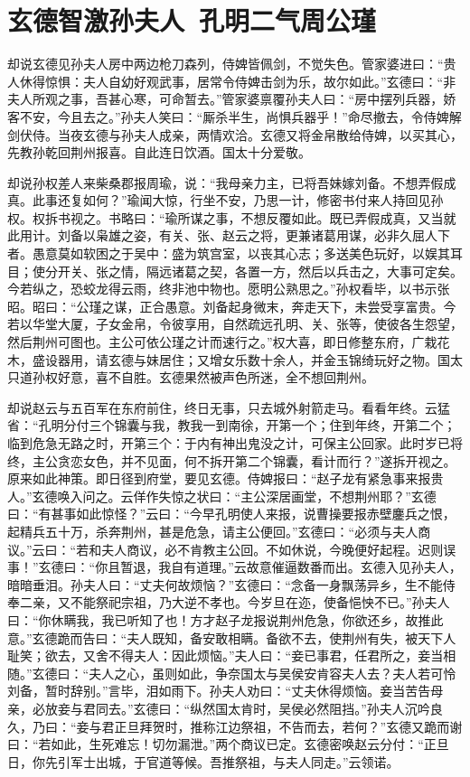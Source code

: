 \chapter{玄德智激孙夫人~孔明二气周公瑾}

却说玄德见孙夫人房中两边枪刀森列，侍婢皆佩剑，不觉失色。管家婆进曰：“贵人休得惊惧：夫人自幼好观武事，居常令侍婢击剑为乐，故尔如此。”玄德曰：“非夫人所观之事，吾甚心寒，可命暂去。”管家婆禀覆孙夫人曰：“房中摆列兵器，娇客不安，今且去之。”孙夫人笑曰：“厮杀半生，尚惧兵器乎！”命尽撤去，令侍婢解剑伏侍。当夜玄德与孙夫人成亲，两情欢洽。玄德又将金帛散给侍婢，以买其心，先教孙乾回荆州报喜。自此连日饮酒。国太十分爱敬。

却说孙权差人来柴桑郡报周瑜，说：“我母亲力主，已将吾妹嫁刘备。不想弄假成真。此事还复如何？”瑜闻大惊，行坐不安，乃思一计，修密书付来人持回见孙权。权拆书视之。书略曰：“瑜所谋之事，不想反覆如此。既已弄假成真，又当就此用计。刘备以枭雄之姿，有关、张、赵云之将，更兼诸葛用谋，必非久屈人下者。愚意莫如软困之于吴中：盛为筑宫室，以丧其心志；多送美色玩好，以娱其耳目；使分开关、张之情，隔远诸葛之契，各置一方，然后以兵击之，大事可定矣。今若纵之，恐蛟龙得云雨，终非池中物也。愿明公熟思之。”孙权看毕，以书示张昭。昭曰：“公瑾之谋，正合愚意。刘备起身微末，奔走天下，未尝受享富贵。今若以华堂大厦，子女金帛，令彼享用，自然疏远孔明、关、张等，使彼各生怨望，然后荆州可图也。主公可依公瑾之计而速行之。”权大喜，即日修整东府，广栽花木，盛设器用，请玄德与妹居住；又增女乐数十余人，并金玉锦绮玩好之物。国太只道孙权好意，喜不自胜。玄德果然被声色所迷，全不想回荆州。

却说赵云与五百军在东府前住，终日无事，只去城外射箭走马。看看年终。云猛省：“孔明分付三个锦囊与我，教我一到南徐，开第一个；住到年终，开第二个；临到危急无路之时，开第三个：于内有神出鬼没之计，可保主公回家。此时岁已将终，主公贪恋女色，并不见面，何不拆开第二个锦囊，看计而行？”遂拆开视之。原来如此神策。即日径到府堂，要见玄德。侍婢报曰：“赵子龙有紧急事来报贵人。”玄德唤入问之。云佯作失惊之状曰：“主公深居画堂，不想荆州耶？”玄德曰：“有甚事如此惊怪？”云曰：“今早孔明使人来报，说曹操要报赤壁鏖兵之恨，起精兵五十万，杀奔荆州，甚是危急，请主公便回。”玄德曰：“必须与夫人商议。”云曰：“若和夫人商议，必不肯教主公回。不如休说，今晚便好起程。迟则误事！”玄德曰：“你且暂退，我自有道理。”云故意催逼数番而出。玄德入见孙夫人，暗暗垂泪。孙夫人曰：“丈夫何故烦恼？”玄德曰：“念备一身飘荡异乡，生不能侍奉二亲，又不能祭祀宗祖，乃大逆不孝也。今岁旦在迩，使备悒怏不已。”孙夫人曰：“你休瞒我，我已听知了也！方才赵子龙报说荆州危急，你欲还乡，故推此意。”玄德跪而告曰：“夫人既知，备安敢相瞒。备欲不去，使荆州有失，被天下人耻笑；欲去，又舍不得夫人：因此烦恼。”夫人曰：“妾已事君，任君所之，妾当相随。”玄德曰：“夫人之心，虽则如此，争奈国太与吴侯安肯容夫人去？夫人若可怜刘备，暂时辞别。”言毕，泪如雨下。孙夫人劝曰：“丈夫休得烦恼。妾当苦告母亲，必放妾与君同去。”玄德曰：“纵然国太肯时，吴侯必然阻挡。”孙夫人沉吟良久，乃曰：“妾与君正旦拜贺时，推称江边祭祖，不告而去，若何？”玄德又跪而谢曰：“若如此，生死难忘！切勿漏泄。”两个商议已定。玄德密唤赵云分付：“正旦日，你先引军士出城，于官道等候。吾推祭祖，与夫人同走。”云领诺。

